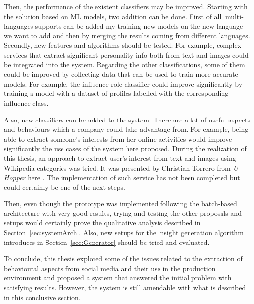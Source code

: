 Then, the performance of the existent classifiers may be improved. Starting with the solution based on ML models, two addition can be done. First of all, multi-languages supports can be added my training new models on the new language we want to add and then by merging the results coming from different languages. Secondly, new features and algorithms should be tested. For example, complex services that extract significant personality info both from text and images could be integrated into the system.
Regarding the other classifications, some of them could be improved by collecting data that can be used to train more accurate models. For example, the influence role classifier could improve significantly by training a model with a dataset of profiles labelled with the corresponding influence class.

Also, new classifiers can be added to the system. There are a lot of useful aspects and behaviours which a company could take advantage from. For example, being able to extract someone's interests from her online activities would improve significantly the use cases of the system here proposed.
During the realization of this thesis, an approach to extract user's interest from text and images using Wikipedia categories was tried. It was presented by Christian Torrero from \textit{U-Hopper} here \cite{torrero2018wikipedia}.
The implementation of such service has not been completed but could certainly be one of the next steps.

Then, even though the prototype was implemented following the batch-based architecture with very good results, trying and testing the other proposals and setups would certainly prove the qualitative analysis described in Section~\ref{sec:systemArch}.
Also, new setups for the insight generation algorithm introduces in Section~\ref{sec:Generator} should be tried and evaluated.

To conclude, this thesis explored some of the issues related to the extraction of behavioural aspects from social media and their use in the production environment and proposed a system that answered the initial problem with satisfying results.
However, the system is still amendable with what is described in this conclusive section.

